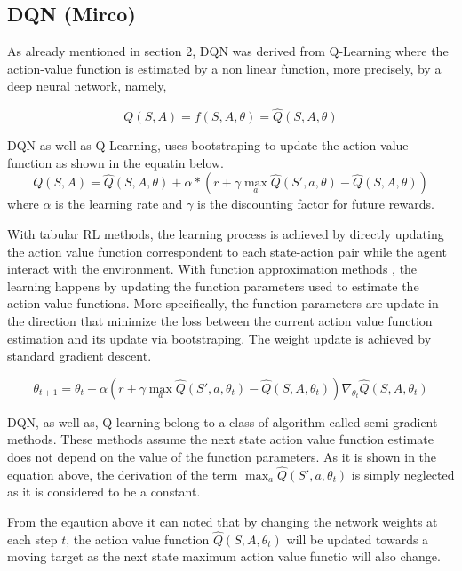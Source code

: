 \documentclass{article}
\begin{document}
\subsection{DQN (Mirco)}

As already mentioned in section 2, DQN was derived from Q-Learning where the action-value function is estimated by a non linear function, more precisely, by a deep neural network, namely,

\begin{equation}
Q(S,A)  = f(S,A,\theta) = \hat{Q}(S,A,\theta)
\end{equation}

DQN as well as Q-Learning, uses bootstraping to update the action value function as shown in the equatin below. 
\begin{equation}
Q(S,A)  =  \hat{Q}(S,A,\theta)  + \alpha * \left( r + \gamma \max_{a} \hat{Q}(S',a,\theta) - \hat{Q}(S,A,\theta) \right)
\end{equation}
where $\alpha$ is the learning rate and $\gamma$ is the discounting factor for future rewards.
 
With tabular RL  methods, the learning process is achieved by directly updating the action value function correspondent to each state-action pair while the agent interact with the environment. With function approximation methods , the learning happens by updating the function parameters used to estimate the action value functions.
More specifically, the function parameters are update in the direction that minimize the loss between the current action value function estimation and its update via bootstraping. The weight update is achieved by standard gradient descent.

\begin{equation}
\theta_{t+1}  = \theta_{t} + \alpha \left( r + \gamma \max_{a} \hat{Q}(S',a,\theta_{t})  -  \hat{Q}(S,A,\theta_{t}) \right) \nabla_{\theta_{t}} \hat{Q}(S,A,\theta_{t})
\end{equation}

DQN, as well as, Q learning belong to a class of algorithm called semi-gradient methods. These methods assume the next state action value function estimate does not depend on the value of the function parameters. As it is shown in the equation above, the derivation of the term $\max_{a} \hat{Q}(S',a,\theta_{t}) $ is simply neglected as it is considered to be a constant. 

From the eqaution above it can noted that by changing the network weights at each step $t$, the  action value function $\hat{Q}(S,A,\theta_{t})$ will be updated towards a moving target as the  next state maximum action value functio will also  change.
\end{document}
